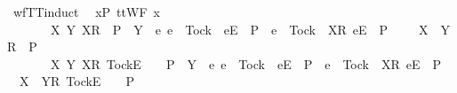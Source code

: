 \begin{isabellebody}
\isanewline
{}\isamarkupfalse%
\ wf{\isacharunderscore}TT{}{\isacharunderscore}induct{\isacharcolon}\isanewline
\ \ {\isachardoublequoteopen}{\isasymforall}x{\isasymin}P{\isachardot}\ ttWF\ x\ {\isasymLongrightarrow}\isanewline
\ \ \ \ {\isacharparenleft}{\isasymAnd}\ {\isasymrho}\ {\isasymsigma}\ X\ Y{\isachardot}\ {\isacharparenleft}{\isacharbrackleft}{\isacharbrackleft}X{\isacharbrackright}\isactrlsub R{\isacharbrackright}\ {\isasymin}\ P\ {\isasymand}\ {\isacharparenleft}Y\ {\isasyminter}\ {\isacharbraceleft}e{\isachardot}\ {\isacharparenleft}e\ {\isasymnoteq}\ Tock\ {\isasymand}\ {\isacharbrackleft}{\isacharbrackleft}e{\isacharbrackright}\isactrlsub E{\isacharbrackright}\ {\isasymin}\ P{\isacharparenright}\ {\isasymor}\ {\isacharparenleft}e\ {\isacharequal}\ Tock\ {\isasymand}\ {\isacharbrackleft}{\isacharbrackleft}X{\isacharbrackright}\isactrlsub R{\isacharcomma}\ {\isacharbrackleft}e{\isacharbrackright}\isactrlsub E{\isacharbrackright}\ {\isasymin}\ P{\isacharparenright}\ {\isacharbraceright}\ {\isacharequal}\ {\isacharbraceleft}{\isacharbraceright}{\isacharparenright}{\isacharparenright}\ {\isasymLongrightarrow}\ {\isacharbrackleft}{\isacharbrackleft}X\ {\isasymunion}\ Y{\isacharbrackright}\isactrlsub R{\isacharbrackright}\ {\isasymin}\ P{\isacharparenright}\ {\isasymLongrightarrow}\isanewline
\ \ \ \ {\isacharparenleft}{\isasymAnd}\ {\isasymrho}\ {\isasymsigma}\ X\ Y{\isachardot}\ {\isacharparenleft}{\isacharbrackleft}{\isacharbrackleft}X{\isacharbrackright}\isactrlsub R{\isacharcomma}\ {\isacharbrackleft}Tock{\isacharbrackright}\isactrlsub E{\isacharbrackright}\ {\isacharat}\ {\isasymsigma}\ {\isasymin}\ P\ {\isasymand}\ {\isacharparenleft}Y\ {\isasyminter}\ {\isacharbraceleft}e{\isachardot}\ e\ {\isasymnoteq}\ Tock\ {\isasymand}\ {\isacharbrackleft}{\isacharbrackleft}e{\isacharbrackright}\isactrlsub E{\isacharbrackright}\ {\isasymin}\ P\ {\isasymor}\ e\ {\isacharequal}\ Tock\ {\isasymand}\ {\isacharbrackleft}{\isacharbrackleft}X{\isacharbrackright}\isactrlsub R{\isacharcomma}\ {\isacharbrackleft}e{\isacharbrackright}\isactrlsub E{\isacharbrackright}\ {\isasymin}\ P{\isacharbraceright}\ {\isacharequal}\ {\isacharbraceleft}{\isacharbraceright}{\isacharparenright}{\isacharparenright}\ {\isasymLongrightarrow}\ {\isacharbrackleft}{\isacharbrackleft}X\ {\isasymunion}\ Y{\isacharbrackright}\isactrlsub R{\isacharcomma}\ {\isacharbrackleft}Tock{\isacharbrackright}\isactrlsub E{\isacharbrackright}\ {\isacharat}\ {\isasymsigma}\ {\isasymin}\ P{\isacharparenright}\ {\isasymLongrightarrow}\isanewline

\end{isabellebody}
